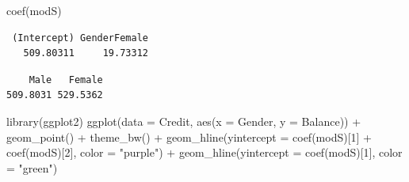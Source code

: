 \documentclass[
]{article}
\newenvironment{Shaded}{\begin{snugshade}}{\end{snugshade}}
\newcommand{\AttributeTok}[1]{\textcolor[rgb]{0.77,0.63,0.00}{#1}}
\newcommand{\DecValTok}[1]{\textcolor[rgb]{0.00,0.00,0.81}{#1}}
\newcommand{\FunctionTok}[1]{\textcolor[rgb]{0.00,0.00,0.00}{#1}}
\newcommand{\NormalTok}[1]{#1}
\newcommand{\SpecialCharTok}[1]{\textcolor[rgb]{0.00,0.00,0.00}{#1}}
\newcommand{\StringTok}[1]{\textcolor[rgb]{0.31,0.60,0.02}{#1}}
\begin{document}
\begin{Shaded}
\begin{Highlighting}[]
\FunctionTok{coef}\NormalTok{(modS)}
\end{Highlighting}
\end{Shaded}

\begin{verbatim}
 (Intercept) GenderFemale 
   509.80311     19.73312 
\end{verbatim}

\begin{Shaded}
\end{Shaded}

\begin{verbatim}
    Male   Female 
509.8031 529.5362 
\end{verbatim}

\begin{Shaded}
\begin{Highlighting}[]
\FunctionTok{library}\NormalTok{(ggplot2)}
\FunctionTok{ggplot}\NormalTok{(}\AttributeTok{data =}\NormalTok{ Credit, }\FunctionTok{aes}\NormalTok{(}\AttributeTok{x =}\NormalTok{ Gender, }\AttributeTok{y =}\NormalTok{ Balance)) }\SpecialCharTok{+} 
  \FunctionTok{geom\_point}\NormalTok{() }\SpecialCharTok{+} 
  \FunctionTok{theme\_bw}\NormalTok{() }\SpecialCharTok{+} 
  \FunctionTok{geom\_hline}\NormalTok{(}\AttributeTok{yintercept =} \FunctionTok{coef}\NormalTok{(modS)[}\DecValTok{1}\NormalTok{] }\SpecialCharTok{+} \FunctionTok{coef}\NormalTok{(modS)[}\DecValTok{2}\NormalTok{], }\AttributeTok{color =} \StringTok{"purple"}\NormalTok{) }\SpecialCharTok{+} 
  \FunctionTok{geom\_hline}\NormalTok{(}\AttributeTok{yintercept =} \FunctionTok{coef}\NormalTok{(modS)[}\DecValTok{1}\NormalTok{], }\AttributeTok{color =} \StringTok{"green"}\NormalTok{)}
\end{Highlighting}
\end{Shaded}
\end{document}
